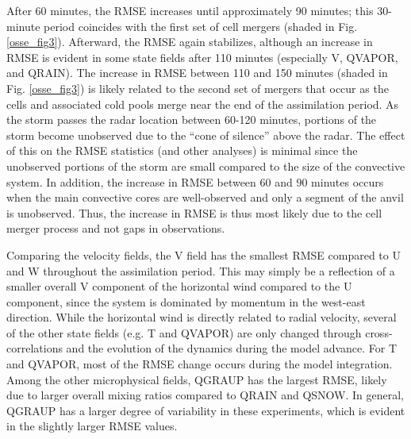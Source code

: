 After 60 minutes, the RMSE increases until approximately 90 minutes; this 30-minute period coincides with the first set of cell mergers (shaded in Fig. \ref{osse_fig3}). Afterward, the RMSE again stabilizes, although an increase in RMSE is evident in some state fields after 110 minutes (especially V, QVAPOR, and QRAIN). The increase in RMSE between 110 and 150 minutes (shaded in Fig. \ref{osse_fig3}) is likely related to the second set of mergers that occur as the cells and associated cold pools merge near the end of the assimilation period. As the storm passes the radar location between 60-120 minutes, portions of the storm become unobserved due to the “cone of silence” above the radar. The effect of this on the RMSE statistics (and other analyses) is minimal since the unobserved portions of the storm are small compared to the size of the convective system. In addition, the increase in RMSE between 60 and 90 minutes occurs when the main convective cores are well-observed and only a segment of the anvil is unobserved. Thus, the increase in RMSE is thus most likely due to the cell merger process and not gaps in observations.

Comparing the velocity fields, the V field has the smallest RMSE compared to U and W throughout the assimilation period. This may simply be a reflection of a smaller overall V component of the horizontal wind compared to the U component, since the system is dominated by momentum in the west-east direction. While the horizontal wind is directly related to radial velocity, several of the other state fields (e.g. T and QVAPOR) are only changed through cross-correlations and the evolution of the dynamics during the model advance. For T and QVAPOR, most of the RMSE change occurs during the model integration. Among the other microphysical fields, QGRAUP has the largest RMSE, likely due to larger overall mixing ratios compared to QRAIN and QSNOW. In general, QGRAUP has a larger degree of variability in these experiments, which is evident in the slightly larger RMSE values.

